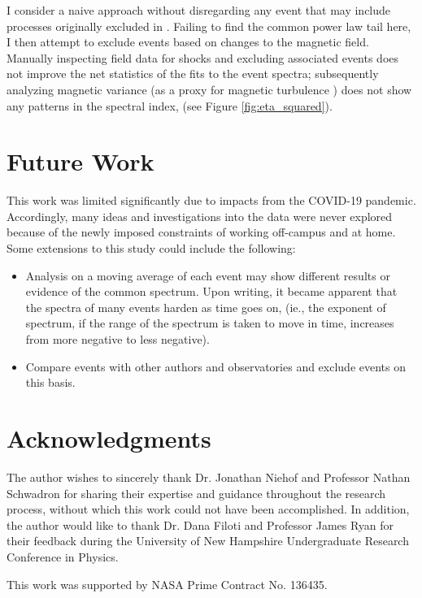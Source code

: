 \documentclass[letterpaper,11pt]{article}
\begin{document}
I consider a naive approach without disregarding any event that may include processes originally excluded in \citet{Fisk2006}.  Failing to find the common power law tail here, I then attempt to exclude events based on changes to the magnetic field.  Manually inspecting field data for shocks and excluding associated events does not improve the net statistics of the fits to the event spectra; subsequently analyzing magnetic variance (as a proxy for magnetic turbulence \citep{Schwadron1996}) does not show any patterns in the spectral index, (see Figure \ref{fig:eta_squared}).



\section{Future Work}
\label{sec:future}
This work was limited significantly due to impacts from the COVID-19 pandemic.  Accordingly, many ideas and investigations into the data were never explored because of the newly imposed constraints of working off-campus and at home.  Some extensions to this study could include the following:

\begin{itemize}
\item Analysis on a moving average of each event may show different results or evidence of the common spectrum.  Upon writing, it became apparent that the spectra of many events harden as time goes on, (ie., the exponent of spectrum, if the range of the spectrum is taken to move in time, increases from more negative to less negative).
\item Compare events with other authors and observatories and exclude events on this basis.
\end{itemize}



\section{Acknowledgments}
The author wishes to sincerely thank Dr. Jonathan Niehof and Professor Nathan Schwadron for sharing their expertise and guidance throughout the research process, without which this work could not have been accomplished. In addition, the author would like to thank Dr. Dana Filoti and Professor James Ryan for their feedback during the University of New Hampshire Undergraduate Research Conference in Physics.

\bigskip

\noindent This work was supported by NASA Prime Contract No. 136435.




%
%

\end{document}
